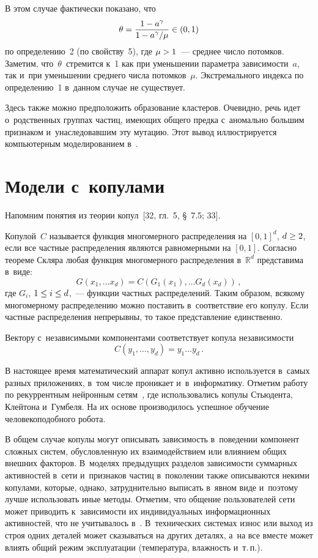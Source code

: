 \begin{multicols}{2}
В этом случае фактически показано, что
$$
\theta=\displaystyle\frac{\displaystyle 1-a^\gamma\mathstrut}{\displaystyle 1-a^\gamma/\mu\mathstrut}\in (0,1)
$$ 
по определению~2
(по свойству~5), где $\mu\hm>1$~--- среднее число потомков. Заметим,
что~$\theta$~стремится к~1 как при уменьшении параметра зависимости~$a$,
так и~при уменьшении среднего числа потомков~$\mu$.
Экстремального индекса по определению~1 в~данном случае не существует.

Здесь также можно предположить образование кластеров.
Очевидно, речь идет о~родственных группах частиц,
имеющих общего предка с~аномально большим признаком
и~унаследовавшим эту мутацию. Этот вывод иллюстрируется
компьютерным моделированием в~\cite{Leb7}.

\section{Модели с~копулами}

Напомним понятия из теории копул~[32, гл.~5, \S~7.5; 33].

Копулой~$C$ называется функция многомерного распределения на $[0,1]^d$,
$d\hm\ge 2$, если все частные
распределения являются равномерными на $[0,1]$. Согласно теореме Скляра
любая функция многомерного
распределения в~${\mathbb{R}}^d$ представима в~виде:
$$
G\left(x_1,\dots x_d\right)=C\left(G_1\left(x_1\right),\dots G_d\left(x_d\right)\right)\,,
$$
где $G_i$, $1\hm\le i\hm\le d$,~--- функции частных распределений. Таким образом,
всякому многомерному
распределению можно поставить в~соответствие его копулу. Если частные распределения
непрерывны, то такое представление единственно.

Вектору с~независимыми компонентами соответствует копула независимости
$$
C(y_1,\dots,y_d)=y_1\dots y_d\,.
$$

В настоящее время математический аппарат копул активно используется в~самых разных
приложениях, в~том числе проникает и~в~информатику.
Отметим работу по рекуррентным нейронным сетям~\cite{Chat},
где использовались копулы Стьюдента, Клейтона и~Гумбеля. На их основе производилось
успешное обучение человекоподобного робота.

В общем случае копулы могут описывать зависимость в~поведении
компонент сложных систем, обусловленную их взаимодействием или
влиянием общих внешних факторов. В~моделях предыдущих разделов
зависимости суммарных активностей в~сети и~признаков частиц
в~поколении также описываются некими копулами, которые, однако,
затруднительно выписать в~явном виде и~поэтому лучше использовать
иные методы. Отметим, что общение пользователей сети может приводить
к~зависимости их индивидуальных информационных активностей, что не
учитывалось в~\cite{Leb4}. В~технических системах износ или выход из
строя одних деталей может сказываться на других деталях, а~на все
вместе может влиять общий режим эксплуатации (температура, влажность
и~т.\,п.).


\end{multicols}
